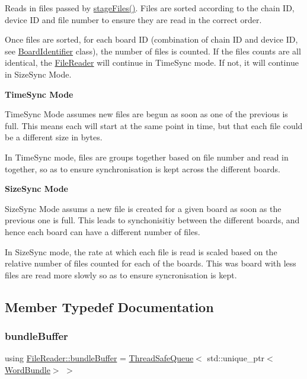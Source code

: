 Reads in files passed by \hyperlink{class_file_reader_a5d487d37857d537ace41c31d6594ef3a}{stage\+Files()}. Files are sorted according to the chain ID, device ID and file number to ensure they are read in the correct order.

Once files are sorted, for each board ID (combination of chain ID and device ID, see \hyperlink{class_board_identifier}{Board\+Identifier} class), the number of files is counted. If the files counts are all identical, the \hyperlink{class_file_reader}{File\+Reader} will continue in Time\+Sync mode. If not, it will continue in Size\+Sync Mode.

{\bfseries Time\+Sync Mode}

Time\+Sync Mode assumes new files are begun as soon as one of the previous is full. This means each will start at the same point in time, but that each file could be a different size in bytes.

In Time\+Sync mode, files are groups together based on file number and read in together, so as to ensure synchronisation is kept across the different boards.

{\bfseries Size\+Sync Mode}

Size\+Sync Mode assums a new file is created for a given board as soon as the previous one is full. This leads to synchonisitiy between the different boards, and hence each board can have a different number of files.

In Size\+Sync mode, the rate at which each file is read is scaled based on the relative number of files counted for each of the boards. This was board with less files are read more slowly so as to ensure syncronisation is kept. 

\subsection{Member Typedef Documentation}
\mbox{\label{class_file_reader_ac755c1e271610c2c12a7fc5b55cc048b}} 
\subsubsection{\texorpdfstring{bundle\+Buffer}{bundleBuffer}}
{\footnotesize\ttfamily using \hyperlink{class_file_reader_ac755c1e271610c2c12a7fc5b55cc048b}{File\+Reader\+::bundle\+Buffer} =  \hyperlink{class_thread_safe_queue}{Thread\+Safe\+Queue}$<$ std\+::unique\+\_\+ptr$<$\hyperlink{class_word_bundle}{Word\+Bundle}$>$ $>$\hspace{0.3cm}{\ttfamily [private]}}

